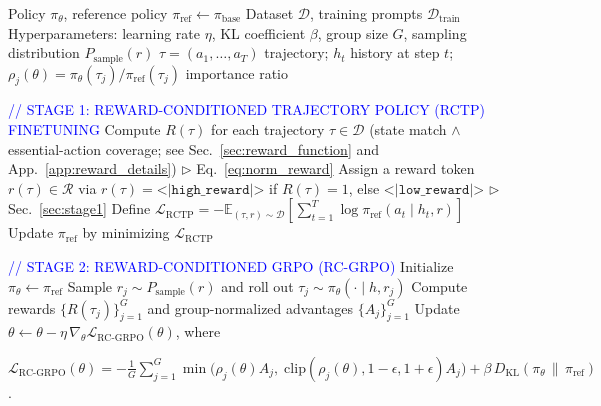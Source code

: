 \documentclass{article}
\theoremstyle{plain}
\theoremstyle{definition}
\theoremstyle{remark}
\begin{document}
\begin{algorithm}[t]
  \caption{RC-GRPO Full Pipeline}
  \label{alg:rcgrpo}
  \begin{algorithmic}[1]
     Policy $\pi_\theta$, reference policy $\pi_{\text{ref}} \leftarrow \pi_{\text{base}}$
     Dataset $\mathcal{D}$, training prompts $\mathcal{D}_{\text{train}}$
     Hyperparameters: learning rate $\eta$, KL coefficient $\beta$, group size $G$, sampling distribution $P_{\text{sample}}(r)$
     $\tau = (a_1, \ldots, a_T)$ trajectory; $h_t$ history at step $t$; $\rho_j(\theta) = \pi_\theta(\tau_j) / \pi_{\text{ref}}(\tau_j)$ importance ratio

    \STATE \textcolor{blue}{// STAGE 1: REWARD-CONDITIONED TRAJECTORY POLICY (RCTP) FINETUNING}
    \STATE Compute $R(\tau)$ for each trajectory $\tau \in \mathcal{D}$ (state match $\wedge$ essential-action coverage; see Sec.~\ref{sec:reward_function} and App.~\ref{app:reward_details}) \hfill $\triangleright$ Eq.~\ref{eq:norm_reward}
    \STATE Assign a reward token $r(\tau) \in \mathcal{R}$ via $r(\tau)=\texttt{<|high\_reward|>}$ if $R(\tau)=1$, else $\texttt{<|low\_reward|>}$ \hfill $\triangleright$ Sec.~\ref{sec:stage1}
    \STATE Define $\mathcal{L}_{\text{RCTP}} = -\mathbb{E}_{(\tau,r)\sim\mathcal{D}}\left[\sum_{t=1}^{T}\log \pi_{\text{ref}}(a_t\mid h_t, r)\right]$
    \STATE Update $\pi_{\text{ref}}$ by minimizing $\mathcal{L}_{\text{RCTP}}$

    \STATE \textcolor{blue}{// STAGE 2: REWARD-CONDITIONED GRPO (RC-GRPO)}
    \STATE Initialize $\pi_\theta \leftarrow \pi_{\text{ref}}$
    \REPEAT
        \STATE Sample $r_j \sim P_{\text{sample}}(r)$ and roll out $\tau_j \sim \pi_\theta(\cdot\mid h, r_j)$
      \ENDFOR
      \STATE Compute rewards $\{R(\tau_j)\}_{j=1}^{G}$ and group-normalized advantages $\{A_j\}_{j=1}^{G}$
      \STATE Update $\theta \leftarrow \theta - \eta\,\nabla_\theta\mathcal{L}_{\text{RC-GRPO}}(\theta)$, where
      \STATE \hspace{1em}\parbox[t]{0.9\linewidth}{$\mathcal{L}_{\text{RC-GRPO}}(\theta)= -\frac{1}{G}\sum_{j=1}^{G}\min\big(\rho_j(\theta)A_j,\;\mathrm{clip}(\rho_j(\theta),1-\epsilon,1+\epsilon)A_j\big) + \beta\,D_{\mathrm{KL}}(\pi_\theta\,\|\,\pi_{\text{ref}})$.}
    \ENDFOR
  \end{algorithmic}
\end{algorithm}
\end{document}
